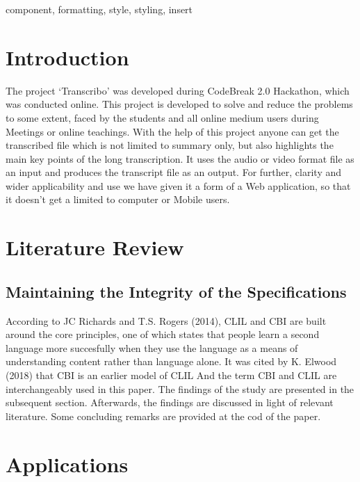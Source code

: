 \documentclass[conference]{IEEEtran}
\begin{document}
\begin{IEEEkeywords}
component, formatting, style, styling, insert
\end{IEEEkeywords}

\section{Introduction}
      
The project ‘Transcribo’ was developed during CodeBreak 2.0 Hackathon, which was conducted online.
This project is developed to solve and reduce the problems to some extent, faced by the students and all online medium users during Meetings or online teachings.
With the help of this project anyone can get the transcribed file which is not limited to summary only, but also highlights the main key points of the long transcription.
It uses the audio or video format file as an input and produces the transcript file as an output. For further, clarity and wider applicability and use we have given it a form of a Web application, so that it doesn’t get a limited to computer or Mobile users.

\section{Literature Review}

\subsection{Maintaining the Integrity of the Specifications}

According to JC Richards and T.S. Rogers (2014), CLIL and CBI are built around the core principles, one of which states that people learn a second language more succesfully when they use the language as a means of understanding content rather than language alone. It was cited by K. Elwood (2018) that CBI is an earlier model of CLIL And the term CBI and CLIL are interchangeably used in this paper. The findings of the study are presented in the subsequent section. Afterwards, the findings are discussed in light of relevant literature. Some concluding remarks are provided at the cod of the paper.~\cite{GNU}

\section{Applications}
\end{document}
